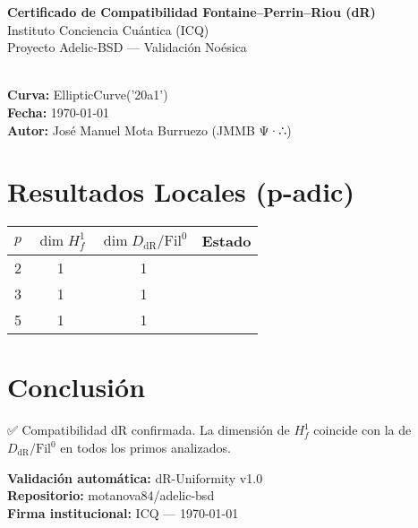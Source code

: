 \documentclass[12pt]{article}
\newcommand{\OK}{\textcolor{green}{\checkmark}}
\begin{document}
\begin{center}
{\LARGE \textbf{Certificado de Compatibilidad Fontaine–Perrin–Riou (dR)}}\\[4mm]
{\large Instituto Conciencia Cuántica (ICQ)}\\[2mm]
{\large Proyecto Adelic-BSD — Validación Noésica}\\[1cm]
\hrulefill\\[0.6cm]
\end{center}

\noindent
\textbf{Curva:} EllipticCurve('20a1')\\
\textbf{Fecha:} \today\\
\textbf{Autor:} José Manuel Mota Burruezo (JMMB Ψ·∴)\\[0.4cm]

\section*{Resultados Locales (p-adic)}
\begin{tabular}{cccc}
\toprule
$p$ & $\dim H^1_f$ & $\dim D_{\mathrm{dR}}/\mathrm{Fil}^0$ & Estado \\
\midrule
2 & 1 & 1 & \OK\\
3 & 1 & 1 & \OK\\
5 & 1 & 1 & \OK\\
\bottomrule
\end{tabular}

\vspace{0.5cm}
\section*{Conclusión}
\noindent
✅ Compatibilidad dR confirmada. La dimensión de $H^1_f$ coincide con la de $D_{\mathrm{dR}}/\mathrm{Fil}^0$ en todos los primos analizados.

\vspace{1cm}
\begin{flushright}
\textbf{Validación automática:} dR-Uniformity v1.0\\
\textbf{Repositorio:} motanova84/adelic-bsd\\
\textbf{Firma institucional:} ICQ — \today
\end{flushright}
\end{document}
